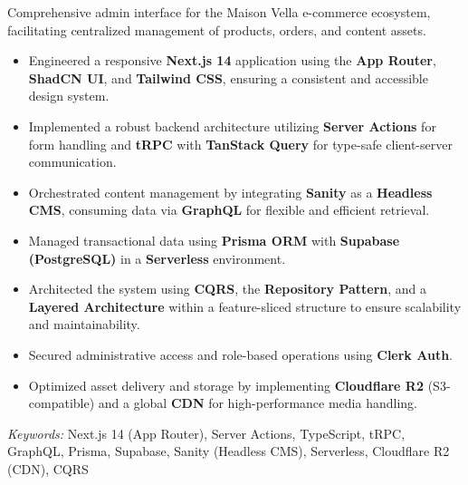 \nointent
{}


\nointent
Comprehensive admin interface for the Maison Vella e-commerce ecosystem, facilitating centralized management of products, orders, and content assets.

\begin{itemize}
    \item Engineered a responsive \textbf{Next.js 14} application using the \textbf{App Router}, \textbf{ShadCN UI}, and \textbf{Tailwind CSS}, ensuring a consistent and accessible design system.
    \item Implemented a robust backend architecture utilizing \textbf{Server Actions} for form handling and \textbf{tRPC} with \textbf{TanStack Query} for type-safe client-server communication.
    \item Orchestrated content management by integrating \textbf{Sanity} as a \textbf{Headless CMS}, consuming data via \textbf{GraphQL} for flexible and efficient retrieval.
    \item Managed transactional data using \textbf{Prisma ORM} with \textbf{Supabase (PostgreSQL)} in a \textbf{Serverless} environment.
    \item Architected the system using \textbf{CQRS}, the \textbf{Repository Pattern}, and a \textbf{Layered Architecture} within a feature-sliced structure to ensure scalability and maintainability.
    \item Secured administrative access and role-based operations using \textbf{Clerk Auth}.
    \item Optimized asset delivery and storage by implementing \textbf{Cloudflare R2} (S3-compatible) and a global \textbf{CDN} for high-performance media handling.
\end{itemize}

\nointent
\textit{Keywords:} Next.js 14 (App Router), Server Actions, TypeScript, tRPC, GraphQL, Prisma, Supabase, Sanity (Headless CMS), Serverless, Cloudflare R2 (CDN), CQRS

\vspace{1em}